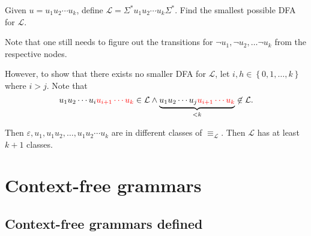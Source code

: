 \documentclass{notes}
\begin{document}
\begin{eg}
  Given $u = u_1 u_2 \cdots u_k$, define $\mathcal L = \Sigma^* u_1 u_2 \cdots u_k \Sigma^*$.
  Find the smallest possible DFA for $\mathcal L$.
  
  \begin{center}
  \end{center}
  
  Note that one still needs to figure out the transitions for $\lnot u_1, \lnot u_2, \dots \lnot u_k$ from the respective nodes.
  
  However, to show that there exists no smaller DFA for $\mathcal L$, let $i, h \in \left \{ 0, 1, \dots, k \right \}$ where $i > j$.
  Note that 
  \[
    u_1 u_2 \cdots u_i {\color{red} u_{i + 1} \cdots u_k} \in \mathcal L \land \underbrace{u_1 u_2 \cdots u_j {\color{red} u_{i + 1} \cdots u_k}}_{< k} \not \in \mathcal L.
  \]
  
  Then $\varepsilon, u_1, u_1 u_2, \dots, u_1 u_2 \cdots u_k$ are in different classes of $\equiv_\mathcal L$.
  Then $\mathcal L$ has at least $k + 1$ classes.
\end{eg}

\newpage

\section{Context-free grammars}

\subsection{Context-free grammars defined}
\end{document}
